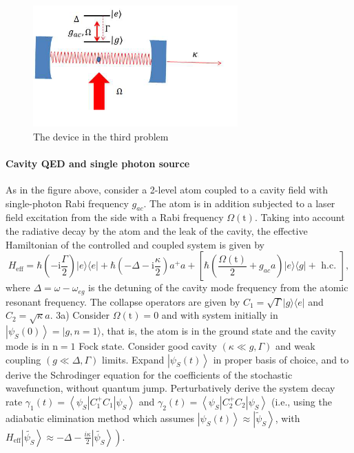 \documentclass[hyperref, a4paper]{article}
\newcommand*{\ii}{\mathrm{i}}
\begin{document}
\begin{figure}
    \centering
    \includegraphics[width=0.7\textwidth]{fig3.png}
    \caption{The device in the third problem}
\end{figure}

\paragraph{Cavity QED and single photon source} As in the figure above, consider a 2-level atom coupled to a cavity field with single-photon Rabi frequency $g_{a c}$. The atom is in addition subjected to a laser field excitation from the side with a Rabi frequency $\Omega(\mathrm{t})$. Taking into account the radiative decay by the atom and the leak of the cavity, the effective Hamiltonian of the controlled and coupled system is given by
\begin{equation}
    H_\text{eff}=\hbar\left(- \ii \frac{\Gamma}{2}\right)|e\rangle\langle e|+\hbar\left(-\Delta- \ii \frac{\kappa}{2}\right) a^{+} a+\left[\hbar\left(\frac{\Omega(\mathrm{t})}{2}+g_{a c} a\right)|e\rangle\langle g|+\text { h.c. }\right],
\end{equation}
where $\Delta=\omega-\omega_{e g}$ is the detuning of the cavity mode frequency from the atomic resonant frequency. The collapse operators are given by $C_{1}=\sqrt{\Gamma}|g\rangle\langle e|$ and $C_{2}=\sqrt{\kappa} a$.
3a) Consider $\Omega(\mathrm{t})=0$ and with system initially in $\left|\psi_{S}(0)\right\rangle=|g, n=1\rangle$, that is, the atom is in the ground state and the cavity mode is in $\mathrm{n}=1$ Fock state. Consider good cavity $(\kappa \ll g, \Gamma)$ and weak coupling $(g \ll \Delta, \Gamma)$ limits. Expand $\left|\psi_{S}(t)\right\rangle$ in proper basis of choice, and to derive the Schrodinger equation for the coefficients of the stochastic wavefunction, without quantum jump. Perturbatively derive the system decay rate $ \gamma_{1}(t)=\left\langle\psi_{S}\left|C_{1}^{+} C_{1}\right| \psi_{S}\right\rangle$ and $ \gamma_{2}(t)=\left\langle\psi_{S}\left|C_{2}^{+} C_{2}\right| \psi_{S}\right\rangle$ (i.e., using the adiabatic elimination method which assumes $\left|\psi_{S}(t)\right\rangle \approx\left|\widetilde{\psi}_{S}\right\rangle$, with $\left.H_\text{eff}\left|\widetilde{\psi_{S}}\right\rangle \approx-\Delta-\frac{i \kappa}{2}\left|\widetilde{\psi_{S}}\right\rangle\right)$.
\end{document}

